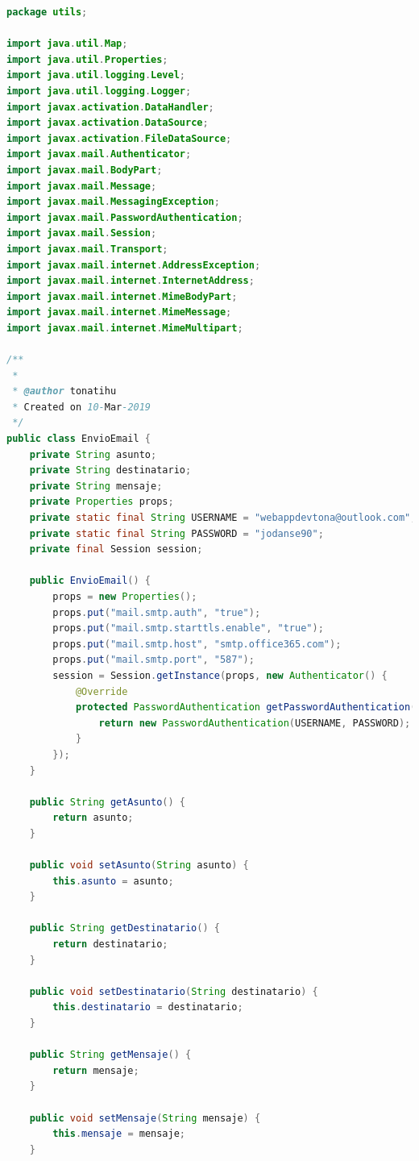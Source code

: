 \documentclass[a4paper,12pt]{article}
\begin{document}
\begin{lstlisting}[language=Java, style=customJava, 
caption={EnvioEmail.java}, captionpos=b,basicstyle=\fontfamily{cmss}\small]
package utils;

import java.util.Map;
import java.util.Properties;
import java.util.logging.Level;
import java.util.logging.Logger;
import javax.activation.DataHandler;
import javax.activation.DataSource;
import javax.activation.FileDataSource;
import javax.mail.Authenticator;
import javax.mail.BodyPart;
import javax.mail.Message;
import javax.mail.MessagingException;
import javax.mail.PasswordAuthentication;
import javax.mail.Session;
import javax.mail.Transport;
import javax.mail.internet.AddressException;
import javax.mail.internet.InternetAddress;
import javax.mail.internet.MimeBodyPart;
import javax.mail.internet.MimeMessage;
import javax.mail.internet.MimeMultipart;

/**
 *
 * @author tonatihu
 * Created on 10-Mar-2019
 */
public class EnvioEmail {
    private String asunto;
    private String destinatario;
    private String mensaje;
    private Properties props;
    private static final String USERNAME = "webappdevtona@outlook.com";
    private static final String PASSWORD = "jodanse90";
    private final Session session;
    
    public EnvioEmail() {
        props = new Properties();
        props.put("mail.smtp.auth", "true");
        props.put("mail.smtp.starttls.enable", "true");
        props.put("mail.smtp.host", "smtp.office365.com");
        props.put("mail.smtp.port", "587");
        session = Session.getInstance(props, new Authenticator() {
            @Override
            protected PasswordAuthentication getPasswordAuthentication() {
                return new PasswordAuthentication(USERNAME, PASSWORD);
            }
        });
    }

    public String getAsunto() {
        return asunto;
    }

    public void setAsunto(String asunto) {
        this.asunto = asunto;
    }

    public String getDestinatario() {
        return destinatario;
    }

    public void setDestinatario(String destinatario) {
        this.destinatario = destinatario;
    }

    public String getMensaje() {
        return mensaje;
    }

    public void setMensaje(String mensaje) {
        this.mensaje = mensaje;
    }
    

\end{lstlisting}
\end{document}
